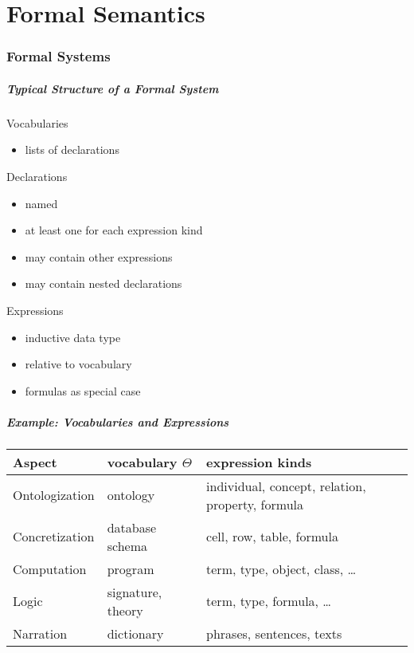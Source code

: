 \part{Formal Semantics}

\section{Formal Systems}

\begin{frame}\frametitle{Typical Structure of a Formal System}
Vocabularies
\begin{itemize}
\item lists of declarations
\end{itemize}

Declarations
\begin{itemize}
\item named
\item at least one for each expression kind
\item may contain other expressions 
\item may contain nested declarations 
\end{itemize}

Expressions
\begin{itemize}
\item inductive data type
\item relative to vocabulary 
\item formulas as special case
\end{itemize}
\end{frame}

\begin{frame}\frametitle{Example: Vocabularies and Expressions}
\begin{center}
\footnotesize
\begin{tabular}{l|ll}
Aspect & vocabulary $\Theta$ & expression kinds \\
\hline
Ontologization  & ontology & individual, concept, relation, property, formula \\
Concretization & database schema & cell, row, table, formula \\
Computation & program & term, type, object, class, \ldots \\
Logic & signature, theory & term, type, formula, \ldots \\
Narration & dictionary & phrases, sentences, texts \\
\end{tabular}
\end{center}
\end{frame}

